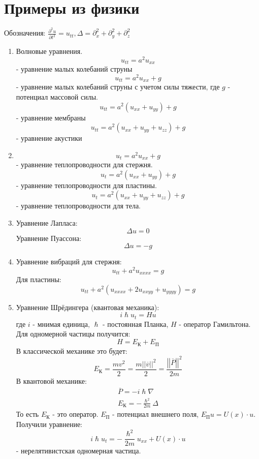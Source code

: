 \section{Примеры из физики}
Обозначения: $\frac{\partial^2 u}{\partial t^2} = u_{tt}, \Delta = \partial_x^2 + \partial_y^2 + \partial_z^2$
\begin{enumerate}
	\item{Волновые уравнения.
			\[
				u_{tt} = a^2 u_{xx}
		\] - уравнение малых колебаний струны
		\[
				u_{tt} = a^2 u_{xx} + g
		\] - уравнение малых колебаний струны с учетом силы тяжести, где $g$ - потенциал массовой силы.
		\[
			u_{tt} = a^2 \left( u_{xx} + u_{yy}\right) + g
		\] - уравнение мембраны
		\[
			u_{tt} = a^2 \left( u_{xx} + u_{yy} + u_{zz}\right) + g
		\] - уравнение акустики
	}
\item{\[
			u_t = a^2 u_{xx} + g
	\] - уравнение теплопроводности для стержня.
	\[
		u_t = a^2 \left( u_{xx} + u_{yy}\right) + g
	\] - уравнение теплопроводности для пластины.
	\[
		u_t = a^2 \left( u_{xx} + u_{yy} + u_{zz}\right) + g
	\] - уравнение теплопроводности для тела.
}
\item{
		Уравнение Лапласа:
		\[
			\Delta u = 0
		\]
		Уравнение Пуассона:
		\[
			\Delta u = -g
		\]
	}
\item{
		Уравнение вибраций для стержня:
		\[
			u_{tt} + a^2 u_{xxxx} = g
		\]
		Для пластины:
		\[
			u_{tt} + a^2 \left(u_{xxxx} + 2 u_{xxyy} + u_{yyyy}\right) = g
		\]
	}
\item{
		Уравнение Шрёдингера (квантовая механика):
		\[
			i \hslash u_t = Hu
		\]
		где $i$ - мнимая единица, $\hslash$ - постоянная Планка, $H$ - оператор Гамильтона. Для одномерной частицы получится:
		\[
			H = E_\text{К} + E_\text{П}
		\]
		В классической механике это будет:
\[
	E_\text{К} = \frac{mv^2}{2} = \frac{m\left| \left| \overline{v}\right| \right|^2}{2} = \frac{\left| \left| \overline{P}\right| \right|^2}{2m}
\]
В квантовой механике:
\[
	\begin{aligned}
		\overline{P} = -i \hslash \nabla \\
		E_\text{К} = -\frac{\hslash^2}{2m} \Delta
	\end{aligned}
\]
То есть $E_\text{К}$ - это оператор. $E_\text{П}$ - потенциал внешнего поля, $E_\text{П}u = U(x) \cdot u$. Получили уравнение:
\[
	i \hslash u_t = -\frac{\hslash^2}{2m} u_{xx} + U(x) \cdot u
\] - нерелятивистская одномерная частица.
	}
	\begin{comment}
	\item{
			Уравнение ОТО (общая теория относительности)

\end{comment}
\end{enumerate}
